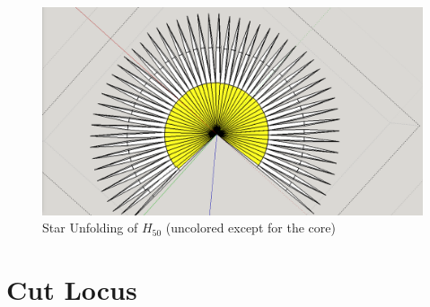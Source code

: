 \documentclass[12 pt]{article}
\begin{document}
\begin{figure}[h]
\caption{Star Unfolding of $H_{50}$ (uncolored except for the core)}
\centering
\includegraphics[scale=0.3]{finalUNP/h50UNP.png}
\end{figure}
\newpage


\section{Cut Locus}
\end{document}
